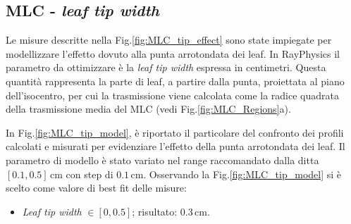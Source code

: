 \subsection{MLC - \textit{leaf tip width}}
Le misure descritte nella Fig.\ref{fig:MLC_tip_effect} sono state impiegate per modellizzare l'effetto dovuto alla punta arrotondata dei leaf. In RayPhysics il parametro da ottimizzare è la \textit{leaf tip width} espressa in centimetri. Questa quantità rappresenta la parte di leaf, a partire dalla punta, proiettata al piano dell'isocentro, per cui la trasmissione viene calcolata come la radice quadrata della trasmissione media del MLC (vedi Fig.\ref{fig:MLC_Regions}a).

In Fig.\ref{fig:MLC_tip_model}, è riportato il particolare del confronto dei profili calcolati e misurati per evidenziare l'effetto della punta arrotondata dei leaf. Il parametro di modello è stato variato nel range raccomandato dalla ditta $[0.1, 0.5]\,$cm con step di $0.1\,$cm. Osservando la Fig.\ref{fig:MLC_tip_model} si è scelto come valore di best fit delle misure:
\begin{itemize}
\item \textit{Leaf tip width} $\in [0,0.5]$; risultato: $0.3\,$cm.
\end{itemize}

